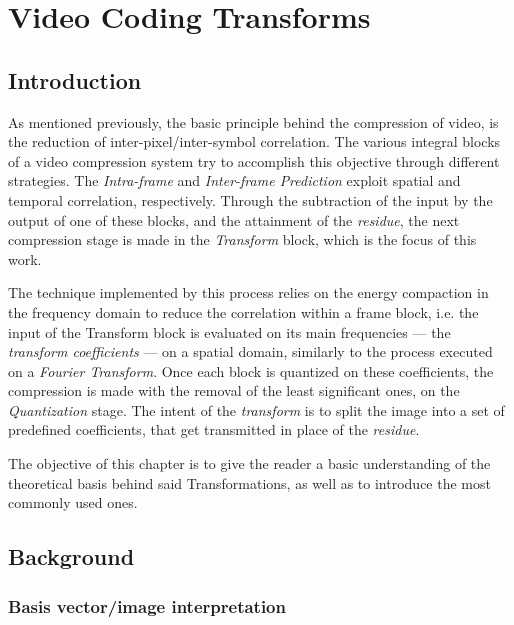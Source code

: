 \cleardoublepage
\chapter{Video Coding Transforms} \label{chap:trans}

\section{{Introduction}}

As mentioned previously, the basic principle behind the compression of video, is the reduction of inter-pixel/inter-symbol correlation. The various integral blocks of a video compression system try to accomplish this objective through different strategies. The \emph{Intra-frame} and \emph{Inter-frame Prediction} exploit spatial and temporal correlation, respectively. Through the subtraction of the input by the output of one of these blocks, and the attainment of the \emph{residue}, the next compression stage is made in the \emph{Transform} block, which is the focus of this work.

The technique implemented by this process relies on the energy compaction in the frequency domain to reduce the correlation within a frame block, i.e. the input of the Transform block is evaluated on its main frequencies --- the \emph{transform coefficients} --- on a spatial domain, similarly to the process executed on a \emph{Fourier Transform}. Once each block is quantized on these coefficients, the compression is made with the removal of the least significant ones, on the \emph{Quantization} stage. The intent of the \emph{transform} is to split the image into a set of predefined coefficients, that get transmitted in place of the \emph{residue}.

The objective of this chapter is to give the reader a basic understanding of the theoretical basis behind said Transformations, as well as to introduce the most commonly used ones. 

\section{Background}
\subsection{Basis vector/image interpretation}

